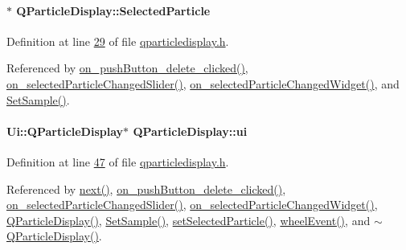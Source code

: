 \hypertarget{class_q_particle_display_ab89d53c5fd63b606de0a3c2e4446d8c1}{}
\paragraph[{Selected\+Particle}]{$\ast$ Q\+Particle\+Display\+::\+Selected\+Particle}\label{class_q_particle_display_ab89d53c5fd63b606de0a3c2e4446d8c1}


Definition at line \hyperlink{qparticledisplay_8h_source_l00029}{29} of file \hyperlink{qparticledisplay_8h_source}{qparticledisplay.\+h}.



Referenced by \hyperlink{qparticledisplay_8cpp_source_l00096}{on\+\_\+push\+Button\+\_\+delete\+\_\+clicked()}, \hyperlink{qparticledisplay_8cpp_source_l00124}{on\+\_\+selected\+Particle\+Changed\+Slider()}, \hyperlink{qparticledisplay_8cpp_source_l00110}{on\+\_\+selected\+Particle\+Changed\+Widget()}, and \hyperlink{qparticledisplay_8cpp_source_l00035}{Set\+Sample()}.

\hypertarget{class_q_particle_display_ae4e6c27c6c2059b4e08358938044a18c}{}
\paragraph[{ui}]{\setlength{\rightskip}{0pt plus 5cm}Ui\+::\+Q\+Particle\+Display$\ast$ Q\+Particle\+Display\+::ui\hspace{0.3cm}{\ttfamily [private]}}\label{class_q_particle_display_ae4e6c27c6c2059b4e08358938044a18c}


Definition at line \hyperlink{qparticledisplay_8h_source_l00047}{47} of file \hyperlink{qparticledisplay_8h_source}{qparticledisplay.\+h}.



Referenced by \hyperlink{qparticledisplay_8cpp_source_l00150}{next()}, \hyperlink{qparticledisplay_8cpp_source_l00096}{on\+\_\+push\+Button\+\_\+delete\+\_\+clicked()}, \hyperlink{qparticledisplay_8cpp_source_l00124}{on\+\_\+selected\+Particle\+Changed\+Slider()}, \hyperlink{qparticledisplay_8cpp_source_l00110}{on\+\_\+selected\+Particle\+Changed\+Widget()}, \hyperlink{qparticledisplay_8cpp_source_l00011}{Q\+Particle\+Display()}, \hyperlink{qparticledisplay_8cpp_source_l00035}{Set\+Sample()}, \hyperlink{qparticledisplay_8cpp_source_l00030}{set\+Selected\+Particle()}, \hyperlink{qparticledisplay_8cpp_source_l00138}{wheel\+Event()}, and \hyperlink{qparticledisplay_8cpp_source_l00022}{$\sim$\+Q\+Particle\+Display()}.



